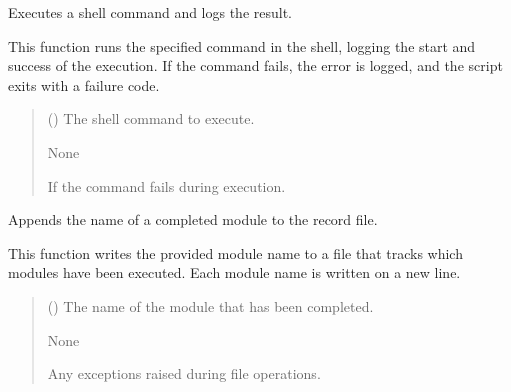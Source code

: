 \documentclass[letterpaper,10pt,english]{sphinxmanual}
\begin{document}
\begin{fulllineitems}
\label{\detokenize{modules.data_storage:modules.data_storage.main.run_command}}
\pysigstartsignatures
\pysiglinewithargsret
{}
{}
{}
\pysigstopsignatures
\sphinxAtStartPar
Executes a shell command and logs the result.

\sphinxAtStartPar
This function runs the specified command in the shell, logging the start and success of the execution.
If the command fails, the error is logged, and the script exits with a failure code.
\begin{quote}\begin{description}
\sphinxAtStartPar
{} () \textendash{} The shell command to execute.

\sphinxAtStartPar
None

\sphinxAtStartPar
{} \textendash{} If the command fails during execution.

\end{description}\end{quote}

\end{fulllineitems}


\begin{fulllineitems}
\label{\detokenize{modules.data_storage:modules.data_storage.main.write_completed_module}}
\pysigstartsignatures
\pysiglinewithargsret
{}
{}
{}
\pysigstopsignatures
\sphinxAtStartPar
Appends the name of a completed module to the record file.

\sphinxAtStartPar
This function writes the provided module name to a file that tracks which modules
have been executed. Each module name is written on a new line.
\begin{quote}\begin{description}
\sphinxAtStartPar
{} () \textendash{} The name of the module that has been completed.

\sphinxAtStartPar
None

\sphinxAtStartPar
Any exceptions raised during file operations.

\end{description}\end{quote}

\end{fulllineitems}
\end{document}
